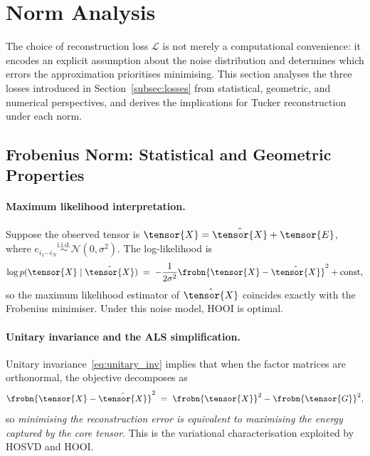 
\section{Norm Analysis}
\label{sec:norms}
The choice of reconstruction loss $\mathcal{L}$ is not merely a
computational convenience: it encodes an explicit assumption about the
noise distribution and determines which errors the approximation
prioritises minimising.
This section analyses the three losses introduced in
Section~\ref{subsec:losses} from statistical, geometric, and numerical
perspectives, and derives the implications for Tucker reconstruction
under each norm.

\subsection{Frobenius Norm: Statistical and Geometric Properties}
\label{subsec:frob_analysis}

\paragraph{Maximum likelihood interpretation.}
Suppose the observed tensor is
$\tensor{X} = \hat{\tensor{X}} + \tensor{E}$,
where $e_{i_1\cdots i_N} \overset{\text{i.i.d.}}{\sim} \mathcal{N}(0, \sigma^2)$.
The log-likelihood is
\begin{equation}
  \log p(\tensor{X} \mid \hat{\tensor{X}})
  \;=\; -\frac{1}{2\sigma^2} \frobn{\tensor{X} - \hat{\tensor{X}}}^2
        + \text{const},
  \label{eq:gauss_ll}
\end{equation}
so the maximum likelihood estimator of $\hat{\tensor{X}}$ coincides
exactly with the Frobenius minimiser.
Under this noise model, HOOI is optimal.

\paragraph{Unitary invariance and the ALS simplification.}
Unitary invariance~\eqref{eq:unitary_inv} implies that when the factor
matrices are orthonormal, the objective decomposes as
\begin{equation}
  \frobn{\tensor{X} - \hat{\tensor{X}}}^2
  \;=\; \frobn{\tensor{X}}^2 - \frobn{\tensor{G}}^2,
  \label{eq:frob_decomp}
\end{equation}
so \emph{minimising the reconstruction error is equivalent to maximising
the energy captured by the core tensor}.
This is the variational characterisation exploited by HOSVD and HOOI.

